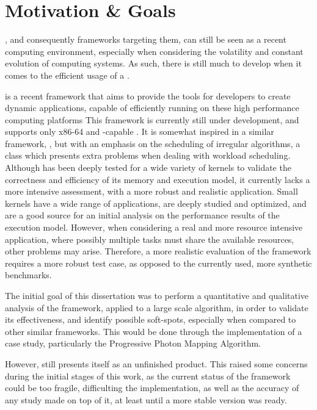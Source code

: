 \documentclass[main.tex]{subfiles}
\begin{document}
\section{Motivation \& Goals}

\hetplats, and consequently frameworks targeting them, can still be seen as a recent computing environment, especially when considering the volatility and constant evolution of computing systems. As such, there is still much to develop when it comes to the efficient usage of a \hetplat.

\gama is a recent framework that aims to provide the tools for developers to create dynamic applications, capable of efficiently running on these high performance computing platforms \cite{joao2012gama}
This framework is currently still under development, and supports only x86-64 \cpus and \cuda-capable \gpus. It is somewhat inspired in a similar framework, \starpu, but with an emphasis on the scheduling of irregular algorithms, a class which presents extra problems when dealing with workload scheduling. Although \gama has been deeply tested for a wide variety of kernels to validate the correctness and efficiency of its memory and execution model, it currently lacks a more intensive assessment, with a more robust and realistic application.
Small kernels have a wide range of applications, are deeply studied and optimized, and are a good source for an initial analysis on the performance results of the execution model. However, when considering a real and more resource intensive application, where possibly multiple tasks must share the available resources, other problems may arise. Therefore, a more realistic evaluation of the framework requires a more robust test case, as opposed to the currently used, more synthetic benchmarks.

The initial goal of this dissertation was to perform a quantitative and qualitative analysis of the \gama framework, applied to a large scale algorithm, in order to validate its effectiveness, and identify possible soft-spots, especially when compared to other similar frameworks. This would be done through the implementation of a case study, particularly the Progressive Photon Mapping Algorithm.

However, \gama still presents itself as an unfinished product. This raised some concerns during the initial stages of this work, as the current status of the framework could be too fragile, difficulting the implementation, as well as the accuracy of any study made on top of it, at least until a more stable version was ready.
\end{document}
